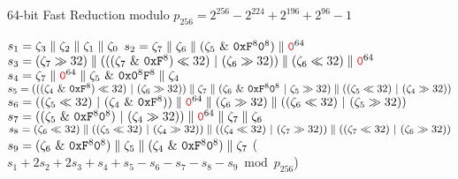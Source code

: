 \begin{algorithm}[H]
\DontPrintSemicolon
\caption{64-bit Fast Reduction modulo $p_{256}=2^{256}-2^{224}+2^{196}+2^{96}-1$}
\BlankLine
{}
\BlankLine
$s_1=\zeta_3\parallel \zeta_2\parallel \zeta_1\parallel \zeta_0$\;
$s_2=\zeta_7\adjacent \zeta_6\adjacent (\zeta_{5}\ \&\ \texttt{0xF}^8\texttt{0}^8) \adjacent \zero^{64}$\;
$s_3=(\zeta_7\gg 32)\adjacent (((\zeta_7\ \&\ \texttt{0xF}^8)\ll 32)\ |\ (\zeta_6\gg 32))\adjacent (\zeta_6\ll 32) \adjacent \zero^{64}$\;
$s_4= \zeta_{7}\adjacent \zero^{64}\adjacent \zeta_{5}\ \&\ \texttt{0x0}^8\texttt{F}^8 \adjacent \zeta_4$\;
$s_5= (((\zeta_4\ \&\ \texttt{0xF}^8)\ll 32)\ |\ (\zeta_6\gg 32))\adjacent \zeta_7\adjacent (\zeta_{6}\ \&\ \texttt{0xF}^8\texttt{0}^8\ |\ \zeta_5\gg 32)\adjacent ((\zeta_{5}\ll 32)\ |\ (\zeta_4\gg 32))$\;
$s_6= ((\zeta_{5}\ll 32)\ |\ (\zeta_4\ \&\ \texttt{0xF}^8))\adjacent \zero^{64}\adjacent (\zeta_6\gg 32)\adjacent((\zeta_6\ll 32)\ |\ (\zeta_5\gg 32))$\;
$s_7= ((\zeta_5\ \&\ \texttt{0xF}^8\texttt{0}^8)\ |\ (\zeta_4\gg 32))\adjacent \zero^{64}\adjacent \zeta_7\adjacent\zeta_6$\;
$s_8= (\zeta_6\ll 32)\adjacent ((\zeta_5\ll 32)\ |\ (\zeta_4\gg 32))\adjacent ((\zeta_4\ll 32)\ |\ (\zeta_{7}\gg 32))\adjacent ((\zeta_7\ll 32)\ |\ (\zeta_{6}\gg 32))$\;
$s_9= (\zeta_6\ \&\ \texttt{0xF}^8\texttt{0}^8)\adjacent \zeta_5\adjacent (\zeta_4\ \&\ \texttt{0xF}^8\texttt{0}^8)\adjacent\zeta_7$\;
\Return ($s_1+2s_2+2s_3+s_4+s_5-s_6-s_7-s_8-s_9\bmod{p_{256}}$)\;
\end{algorithm}





